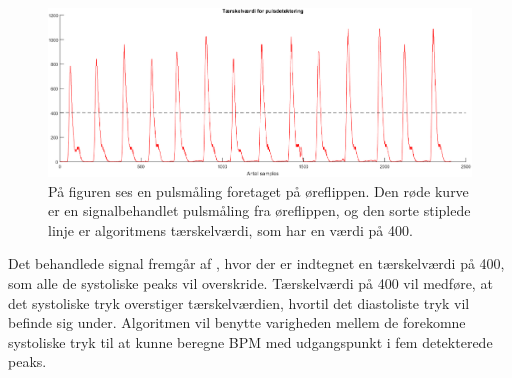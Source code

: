 \begin{figure}[H]
	\centering
	\includegraphics[scale=0.37]{figures/cDesign/puls_taerskel.png}
	\caption{På figuren ses en pulsmåling foretaget på øreflippen. Den røde kurve er en signalbehandlet pulsmåling fra øreflippen, og den sorte stiplede linje er algoritmens tærskelværdi, som har en værdi på 400.}
	\label{fig:taerskel_puls}
\end{figure} \vspace{-0.5cm}
Det behandlede signal fremgår af , hvor der er indtegnet en tærskelværdi på 400, som alle de systoliske peaks vil overskride. Tærskelværdi på 400 vil medføre, at det systoliske tryk overstiger tærskelværdien, hvortil det diastoliste tryk vil befinde sig under. Algoritmen vil benytte varigheden mellem de forekomne systoliske tryk til at kunne beregne BPM med udgangspunkt i fem detekterede peaks. 

